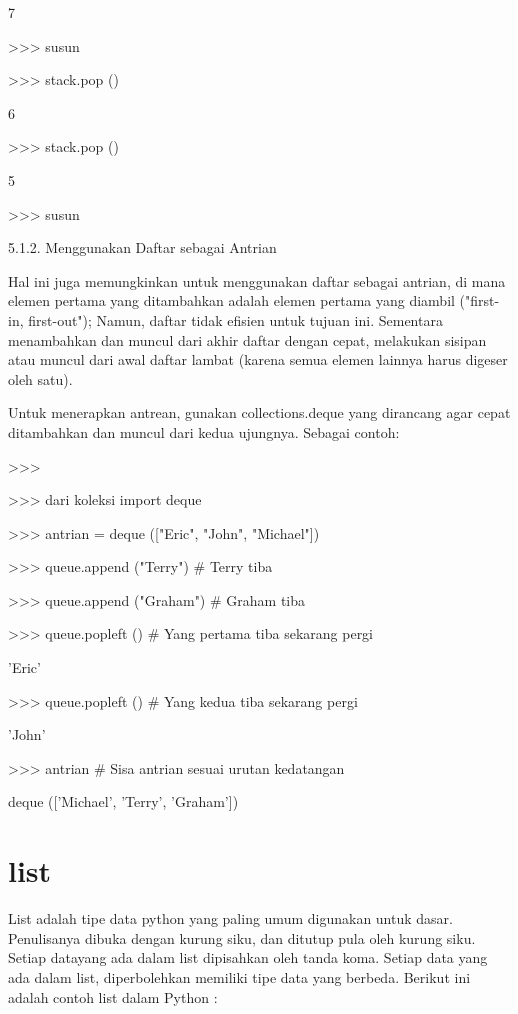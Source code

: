 7 \par
>>> susun \par
[3, 4, 5, 6] \par
>>> stack.pop () \par
6 \par
>>> stack.pop () \par
5 \par
>>> susun \par
[3, 4] \par
\vspace{12pt}
5.1.2. Menggunakan Daftar sebagai Antrian \par
\vspace{12pt}
Hal ini juga memungkinkan untuk menggunakan daftar sebagai antrian, di mana elemen pertama yang ditambahkan adalah elemen pertama yang diambil ("first-in, first-out"); Namun, daftar tidak efisien untuk tujuan ini. Sementara menambahkan dan muncul dari akhir daftar dengan cepat, melakukan sisipan atau muncul dari awal daftar lambat (karena semua elemen lainnya harus digeser oleh satu). \par
\vspace{12pt}
Untuk menerapkan antrean, gunakan collections.deque yang dirancang agar cepat ditambahkan dan muncul dari kedua ujungnya. Sebagai contoh: \par
>>> \par
\vspace{12pt}
>>> dari koleksi import deque \par
>>> antrian = deque (["Eric", "John", "Michael"]) \par
>>> queue.append ("Terry")    \#   Terry tiba \par
>>> queue.append ("Graham")    \#   Graham tiba \par
>>> queue.popleft ()    \#   Yang pertama tiba sekarang pergi \par
'Eric' \par
>>> queue.popleft ()    \#   Yang kedua tiba sekarang pergi \par
'John' \par
>>> antrian    \#   Sisa antrian sesuai urutan kedatangan \par
deque (['Michael', 'Terry', 'Graham']) \par
\vspace{12pt}

\section {list}
List adalah tipe data python yang paling umum digunakan untuk dasar. 
Penulisanya dibuka dengan kurung siku, dan ditutup pula oleh kurung siku. Setiap datayang  ada dalam list dipisahkan oleh tanda koma. 
Setiap data yang ada dalam list, diperbolehkan memiliki tipe data yang berbeda. Berikut ini adalah contoh list dalam Python :

